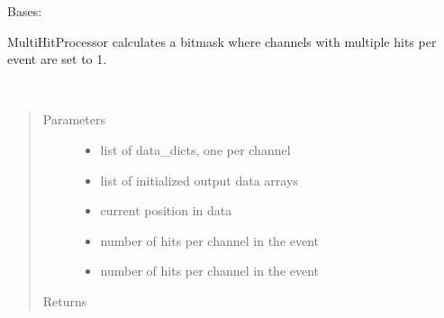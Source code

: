 \documentclass[letterpaper,10pt,english]{sphinxmanual}
\begin{document}
\begin{fulllineitems}
\label{\detokenize{autodocs/data:listmode.data.MultiHitProcessor}}
\sphinxAtStartPar
Bases: {\hyperref[\detokenize{autodocs/data:listmode.data.BitProcessor}]{}}

\sphinxAtStartPar
MultiHitProcessor calculates a bitmask where channels with multiple hits per event are
set to 1.

\begin{fulllineitems}
\label{\detokenize{autodocs/data:listmode.data.MultiHitProcessor.process}}~\begin{quote}\begin{description}
\item[{Parameters}] \leavevmode\begin{itemize}
\item {} 
\sphinxAtStartPar
{} \textendash{} list of data\_dicts, one per channel

\item {} 
\sphinxAtStartPar
{} \textendash{} list of initialized output data arrays

\item {} 
\sphinxAtStartPar
{} \textendash{} current position in data

\item {} 
\sphinxAtStartPar
{} \textendash{} number of hits per channel in the event

\item {} 
\sphinxAtStartPar
{} \textendash{} number of hits per channel in the event

\end{itemize}

\item[{Returns}] \leavevmode
\sphinxAtStartPar


\end{description}\end{quote}

\end{fulllineitems}


\end{fulllineitems}
\end{document}

